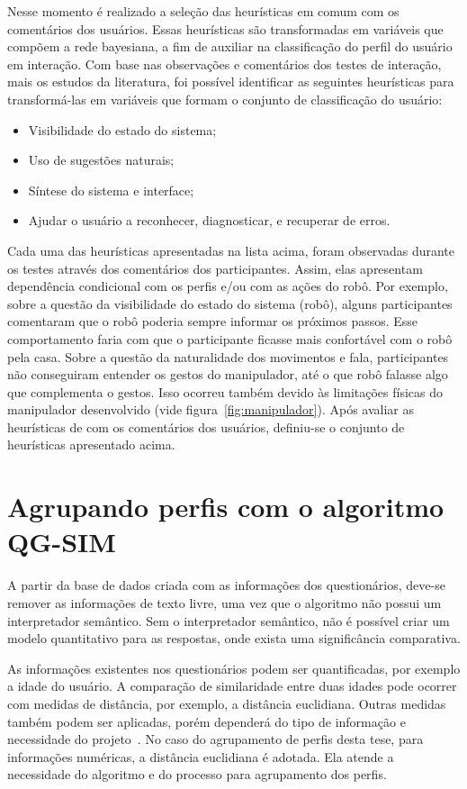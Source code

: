 Nesse momento é realizado a seleção das heurísticas em comum com os comentários dos usuários. Essas heurísticas são transformadas em variáveis que compõem a rede bayesiana, a fim de auxiliar na classificação do perfil do usuário em interação. Com base nas observações e comentários dos testes de interação, mais os estudos da literatura, foi possível identificar as seguintes heurísticas para transformá-las em variáveis que formam o conjunto de classificação do usuário:

\begin{itemize}
	\item Visibilidade do estado do sistema;
	\item Uso de sugestões naturais;
	\item Síntese do sistema e interface;
	\item Ajudar o usuário a reconhecer, diagnosticar, e recuperar de erros.
\end{itemize}

Cada uma das heurísticas apresentadas na lista acima, foram observadas durante os testes através dos comentários dos participantes. Assim, elas apresentam dependência condicional com os perfis e/ou com as ações do robô. Por exemplo, sobre a questão da visibilidade do estado do sistema (robô), alguns participantes comentaram que o robô poderia sempre informar os próximos passos. Esse comportamento faria com que o participante ficasse mais confortável com o robô pela casa. Sobre a questão da naturalidade dos movimentos e fala, participantes não conseguiram entender os gestos do manipulador, até o que robô falasse algo que complementa o gestos. Isso ocorreu também devido às limitações físicas do manipulador desenvolvido (vide figura~\ref{fig:manipulador}). Após avaliar as heurísticas de \textcite{clarkson:2007} com os comentários dos usuários, definiu-se o conjunto de heurísticas apresentado acima.

\section{Agrupando perfis com o algoritmo QG-SIM}
\label{sec:preparacao}
A partir da base de dados criada com as informações dos questionários, deve-se remover as informações de texto livre, uma vez que o algoritmo não possui um interpretador semântico. Sem o interpretador semântico, não é possível criar um modelo quantitativo para as respostas, onde exista uma significância comparativa.

As informações existentes nos questionários podem ser quantificadas, por exemplo a idade do usuário. A comparação de similaridade entre duas idades pode ocorrer com medidas de distância, por exemplo, a distância euclidiana. Outras medidas também podem ser aplicadas, porém dependerá do tipo de informação e necessidade do projeto~\cite{masiero:2013}. No caso do agrupamento de perfis desta tese, para informações numéricas, a distância euclidiana é adotada. Ela atende a necessidade do algoritmo e do processo para agrupamento dos perfis.

